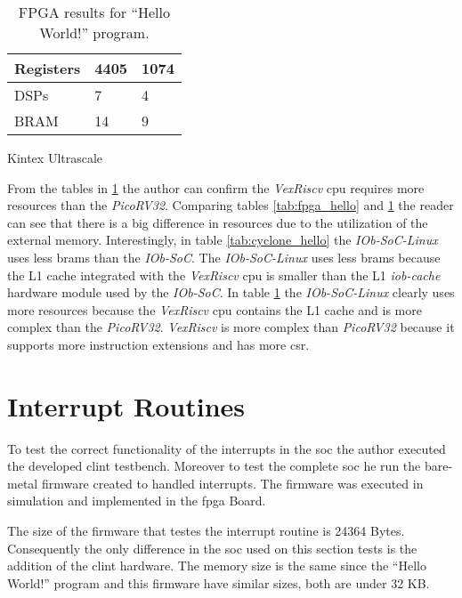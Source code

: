 \begin{table}[!ht]
\begin{subtable}[h]{0.45\textwidth}
\begin{tabular}{l|l|l|}
            \multicolumn{1}{|l|}{Registers} & 4405                   & 1074             \\ \hline
            \multicolumn{1}{|l|}{DSPs}      & 7                      & 4                \\ \hline
            \multicolumn{1}{|l|}{BRAM}      & 14                     & 9                \\ \hline
        \end{tabular}
        \caption{Kintex Ultrascale}
        \label{tab:kintex_hello_int_mem}
     \end{subtable}
     \caption{FPGA results for \enquote{Hello World!} program.}
     \label{tab:fpga_hello_int_mem}
\end{table}

From the tables in \ref{tab:fpga_hello_int_mem} the author can confirm the \textit{VexRiscv} \acrshort{cpu} requires more resources than the \textit{PicoRV32}. Comparing tables \ref{tab:fpga_hello} and \ref{tab:fpga_hello_int_mem} the reader can see that there is a big difference in resources due to the utilization of the external memory. Interestingly, in table \ref{tab:cyclone_hello} the \textit{IOb-SoC-Linux} uses less \acrshort{bram}s than the \textit{IOb-SoC}. The \textit{IOb-SoC-Linux} uses less \acrshort{bram}s because the L1 cache integrated with the \textit{VexRiscv} \acrshort{cpu} is smaller than the L1 \textit{iob-cache} hardware module used by the \textit{IOb-SoC}. In table \ref{tab:fpga_hello_int_mem} the \textit{IOb-SoC-Linux} clearly uses more resources because the \textit{VexRiscv} \acrshort{cpu} contains the L1 cache and is more complex than the \textit{PicoRV32}. \textit{VexRiscv} is more complex than \textit{PicoRV32} because it supports more instruction extensions and has more \acrlong{csr}.

\section{Interrupt Routines}
\label{section:interrupt_routine}
To test the correct functionality of the interrupts in the \acrshort{soc} the author executed the developed \acrshort{clint} testbench. Moreover to test the complete \acrshort{soc} he run the bare-metal firmware created to handled interrupts. The firmware was executed in simulation and implemented in the \acrshort{fpga} Board.

The size of the firmware that testes the interrupt routine is 24364 Bytes. Consequently the only difference in the \acrshort{soc} used on this section tests is the addition of the \acrshort{clint} hardware. The memory size is the same since the \enquote{Hello World!} program and this firmware have similar sizes, both are under 32 KB.


